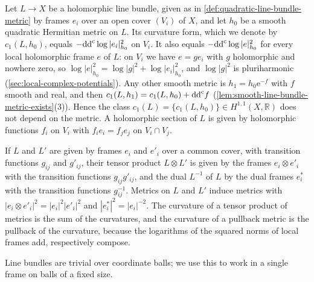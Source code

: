 Let $L\to X$ be a holomorphic line bundle, given as in \cref{def:quadratic-line-bundle-metric} by frames $e_i$ over an open cover $(V_i)$ of $X$, and let $h_0$ be a smooth quadratic Hermitian metric on $L$. Its curvature form, which we denote by $c_1(L,h_0)$, equals $-\mathrm{dd}^{\mathrm{c}}\log|e_i|_{h_0}^2$ on $V_i$. It also equals $-\mathrm{dd}^{\mathrm{c}}\log|e|_{h_0}^2$ for every local holomorphic frame $e$ of $L$: on $V_i$ we have $e=ge_i$ with $g$ holomorphic and nowhere zero, so $\log|e|_{h_0}^2=\log|g|^2+\log|e_i|_{h_0}^2$, and $\log|g|^2$ is pluriharmonic (\cref{sec:local-complex-potentials}). Any other smooth metric is $h_1=h_0\mathrm e^{-f}$ with $f$ smooth and real, and then $c_1(L,h_1)=c_1(L,h_0)+\mathrm{dd}^{\mathrm{c}} f$ (\cref{lem:smooth-line-bundle-metric-exists}(3)). Hence the class $c_1(L)=\{c_1(L,h_0)\}\in H^{1,1}(X,\mathbb R)$ does not depend on the metric. A holomorphic section of $L$ is given by holomorphic functions $f_i$ on $V_i$ with $f_ie_i=f_je_j$ on $V_i\cap V_j$.

If $L$ and $L'$ are given by frames $e_i$ and $e'_i$ over a common cover, with transition functions $g_{ij}$ and $g'_{ij}$, their tensor product $L\otimes L'$ is given by the frames $e_i\otimes e'_i$ with the transition functions $g_{ij}g'_{ij}$, and the dual $L^{-1}$ of $L$ by the dual frames $e_i^*$ with the transition functions $g_{ij}^{-1}$. Metrics on $L$ and $L'$ induce metrics with $|e_i\otimes e'_i|^2=|e_i|^2|e'_i|^2$ and $|e_i^*|^2=|e_i|^{-2}$. The curvature of a tensor product of metrics is the sum of the curvatures, and the curvature of a pullback metric is the pullback of the curvature, because the logarithms of the squared norms of local frames add, respectively compose.

Line bundles are trivial over coordinate balls; we use this to work in a single frame on balls of a fixed size.

